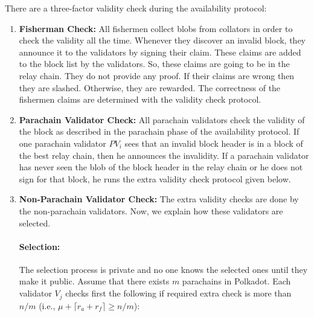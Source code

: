 



There are a three-factor validity check during the availability protocol:


\begin{enumerate}

      
    \item \textbf{Fisherman Check:} All fishermen collect blobs from collators in order to check the validity all the time. Whenever they discover an invalid block, they announce it to the validators by signing their claim. These claims are added to the block list by the validators. So, these claims are going to be in the relay chain. They do not provide any proof. If their claims are wrong then they are slashed. Otherwise, they are rewarded. The correctness of the fishermen claims are determined with the validity check protocol.
    
    \item \textbf{Parachain Validator Check:} All parachain validators check the validity of the block as described in the parachain phase of the availability protocol. If one parachain validator $PV_i$ sees that an invalid block header is in a block of the best relay chain, then he announces the invalidity. If a parachain validator has never seen the blob of the block header in the relay chain or he does not sign for that block, he runs the extra validity check protocol given below.
    
    \item \textbf{Non-Parachain Validator Check:} The extra validity checks are done by the non-parachain validators. Now, we explain how these validators are selected.
    
    \paragraph{Selection:} The selection process is private and no one knows the selected ones until they make it public. Assume that there exists $m$ parachains in Polkadot. Each validator $V_j$ checks first the following if required extra check is more than $n/m$ (i.e., $\mu + \lceil r_a + r_f \rceil \geq n/m$): 
    

\end{enumerate}
